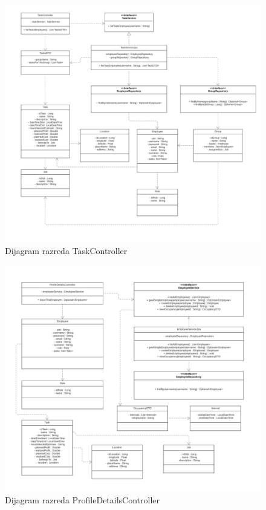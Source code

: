 			
			\eject
			\begin{figure}[H]
					\centering
					\includegraphics[width=\textwidth]{slike/Dijagram razreda - TaskController.jpg}
					\caption{Dijagram razreda TaskController}
				\end{figure}
			
			
			\eject
			\begin{figure}[H]
					\centering
					\includegraphics[width=\textwidth]{slike/Dijagram razreda - ProfileDetailsController.jpg}
					\caption{Dijagram razreda ProfileDetailsController}
				\end{figure}
			
